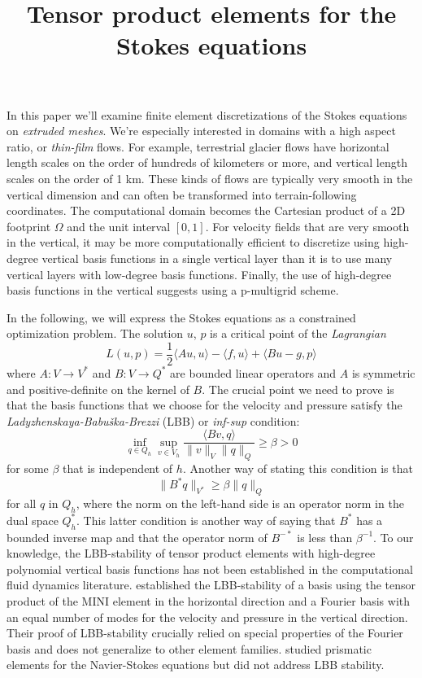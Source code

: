 \documentclass{article}
\title{Tensor product elements for the Stokes equations}
\author{}
\date{}
\theoremstyle{definition}
\theoremstyle{plain}
\begin{document}
\maketitle

In this paper we'll examine finite element discretizations of the Stokes equations on \emph{extruded meshes}.
We're especially interested in domains with a high aspect ratio, or \emph{thin-film} flows.
For example, terrestrial glacier flows have horizontal length scales on the order of hundreds of kilometers or more, and vertical length scales on the order of 1 km.
These kinds of flows are typically very smooth in the vertical dimension and can often be transformed into terrain-following coordinates.
The computational domain becomes the Cartesian product of a 2D footprint $\Omega$ and the unit interval $[0, 1]$.
For velocity fields that are very smooth in the vertical, it may be more computationally efficient to discretize using high-degree vertical basis functions in a single vertical layer than it is to use many vertical layers with low-degree basis functions.
Finally, the use of high-degree basis functions in the vertical suggests using a p-multigrid scheme.

In the following, we will express the Stokes equations as a constrained optimization problem.
The solution $u$, $p$ is a critical point of the \emph{Lagrangian}
\begin{equation}
    L(u, p) = \frac{1}{2}\langle Au, u\rangle - \langle f, u\rangle + \langle Bu - g, p\rangle
\end{equation}
where $A : V \to V^*$ and $B : V \to Q^*$ are bounded linear operators and $A$ is symmetric and positive-definite on the kernel of $B$.
The crucial point we need to prove is that the basis functions that we choose for the velocity and pressure satisfy the \emph{Ladyzhenskaya-Babu\v{s}ka-Brezzi} (LBB) or \emph{inf-sup} condition:
\begin{equation}
    \inf_{q\in Q_h}\sup_{v \in V_h}\frac{\langle Bv, q\rangle}{\|v\|_V\|q\|_Q} \ge \beta > 0
\end{equation}
for some $\beta$ that is independent of $h$.
Another way of stating this condition is that
\begin{equation}
    \|B^*q\|_{V^*} \ge \beta\|q\|_Q
\end{equation}
for all $q$ in $Q_h$, where the norm on the left-hand side is an operator norm in the dual space $Q_h^*$.
This latter condition is another way of saying that $B^*$ has a bounded inverse map and that the operator norm of $B^{-*}$ is less than $\beta^{-1}$.
To our knowledge, the LBB-stability of tensor product elements with high-degree polynomial vertical basis functions has not been established in the computational fluid dynamics literature.
\citet{canuto1984combined} established the LBB-stability of a basis using the tensor product of the MINI element in the horizontal direction and a Fourier basis with an equal number of modes for the velocity and pressure in the vertical direction.
Their proof of LBB-stability crucially relied on special properties of the Fourier basis and does not generalize to other element families.
\citet{nakahashi1989finite} studied prismatic elements for the Navier-Stokes equations but did not address LBB stability.
\end{document}
